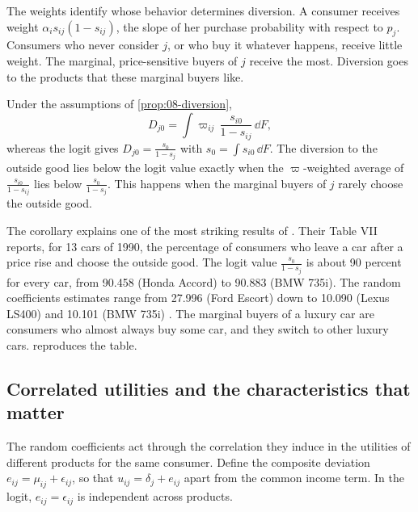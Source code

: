 The weights identify whose behavior determines diversion. A consumer receives weight $\alpha_i s_{ij}(1 -
s_{ij})$, the slope of her purchase probability with respect to $p_j$. Consumers who never consider $j$, or who
buy it whatever happens, receive little weight. The marginal, price-sensitive buyers of $j$ receive the most.
Diversion goes to the products that these marginal buyers like.

\begin{corollary}\label{cor:08-outside-diversion}
Under the assumptions of \cref{prop:08-diversion},
\begin{equation}\label{eq:08-outside-diversion}
  D_{j0} = \int \varpi_{ij}\, \frac{s_{i0}}{1 - s_{ij}}\, \dd F,
\end{equation}
whereas the logit gives $D_{j0} = \frac{s_0}{1 - s_j}$ with $s_0 = \int s_{i0}\, \dd F$. The diversion to the
outside good lies below the logit value exactly when the $\varpi$-weighted average of $\frac{s_{i0}}{1 -
s_{ij}}$ lies below $\frac{s_0}{1 - s_j}$. This happens when the marginal buyers of $j$ rarely choose the outside
good.
\end{corollary}

The corollary explains one of the most striking results of \citet{BerryLevinsohnPakes1995}. Their Table VII
reports, for 13 cars of 1990, the percentage of consumers who leave a car after a price rise and choose the
outside good. The logit value $\frac{s_0}{1 - s_j}$ is about 90 percent for every car, from 90.458 (Honda Accord)
to 90.883 (BMW 735i). The random coefficients estimates range from 27.996 (Ford Escort) down to 10.090 (Lexus
LS400) and 10.101 (BMW 735i) \citep[Table~VII]{BerryLevinsohnPakes1995}. The marginal buyers of a luxury car are
consumers who almost always buy some car, and they switch to other luxury cars.  reproduces
the table.

\subsection{Correlated utilities and the characteristics that matter}\label{sec:08-correlation}

The random coefficients act through the correlation they induce in the utilities of different products for the
same consumer. Define the composite deviation $e_{ij} = \mu_{ij} + \epsilon_{ij}$, so that $u_{ij} = \delta_j +
e_{ij}$ apart from the common income term. In the logit, $e_{ij} = \epsilon_{ij}$ is independent across
products.

